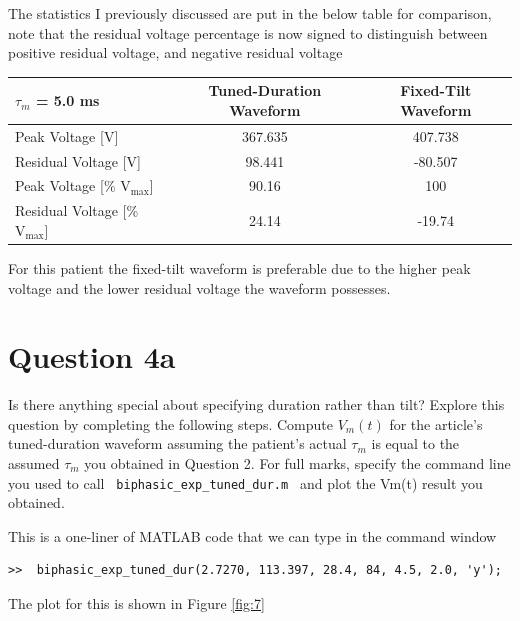 \documentclass[]{report}
\begin{document}
The statistics I previously discussed are put in the below table for comparison, note that the residual voltage percentage is now signed to distinguish between positive residual voltage, and negative residual voltage

\begin{table}[H]
	\centering
	\begin{tabular}{@{}lcc@{}}
		\toprule
		$\tau_m$ = 5.0 ms                     & Tuned-Duration Waveform & Fixed-Tilt Waveform \\ \midrule
		Peak Voltage {[}V{]}                  & 367.635                 & 407.738             \\
		Residual Voltage {[}V{]}              & 98.441                  & -80.507             \\
		Peak Voltage {[}\% $\text{V}_\text{max}${]}  & 90.16                   & 100                 \\
		Residual Voltage {[}\% $\text{V}_\text{max}${]} & 24.14                   & -19.74              
	\end{tabular}
\end{table}

For this patient the fixed-tilt waveform is preferable due to the higher peak voltage and the lower residual voltage the waveform possesses.


\section*{Question 4a}

Is there anything special about specifying duration rather than tilt? Explore this question by 
completing the following steps. Compute $V_m(t)$ for the article’s tuned-duration waveform assuming the patient’s actual $\tau_m$ is equal to the assumed $\tau_m$ you obtained in Question 2. For full marks, specify the command line you used to call \texttt{ biphasic\_exp\_tuned\_dur.m } and plot the Vm(t) result you obtained. 

This is a one-liner of MATLAB code that we can type in the command window

\begin{lstlisting}[style=Matlab-editor, backgroundcolor=\color{smoky}]
>>  biphasic_exp_tuned_dur(2.7270, 113.397, 28.4, 84, 4.5, 2.0, 'y');
\end{lstlisting}

The plot for this is shown in Figure \ref{fig:7}
\end{document}
